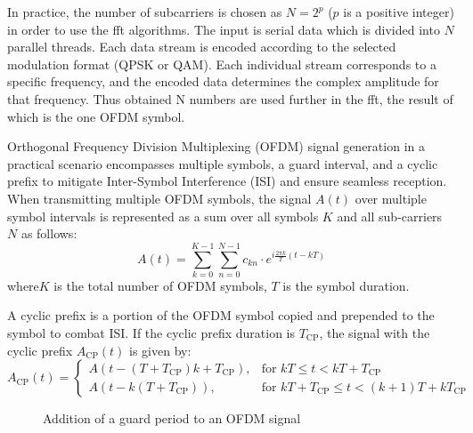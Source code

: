 In practice, the number of subcarriers is chosen as $N = 2^p$ ($p$ is a positive integer) in order to use the \gls{fft} algorithms. 
The input is serial data which is divided into $N$ parallel threads. Each data stream is encoded according to the selected modulation format (QPSK or QAM). Each individual stream corresponds to a specific frequency, and the encoded data determines the complex amplitude for that frequency. Thus obtained N numbers are used further in the \Gls{fft}, the result of which is the one OFDM symbol. 


Orthogonal Frequency Division Multiplexing (OFDM) signal generation in a practical scenario encompasses multiple symbols, a guard interval, and a cyclic prefix to mitigate Inter-Symbol Interference (ISI) and ensure seamless reception. 
When transmitting multiple OFDM symbols, the signal \( A(t) \) over multiple symbol intervals is represented as a sum over all symbols \( K \) and all sub-carriers \( N \) as follows:
\begin{equation}
A(t) = \sum_{k=0}^{K-1} \sum_{n=0}^{N-1} c_{kn} \cdot e^{i \frac{2 \pi k}{T} (t - kT)}
\label{eq:ofdm_signal}
\end{equation}
where\( K \) is the total number of OFDM symbols, \( T \) is the symbol duration.

A cyclic prefix is a portion of the OFDM symbol copied and prepended to the symbol to combat ISI. If the cyclic prefix duration is \( T_{\text{CP}} \), the signal with the cyclic prefix \( A_{\text{CP}}(t) \) is given by:
\begin{equation}
A_{\text{CP}}(t) = 
\begin{cases} 
A(t - (T + T_{\text{CP}})k + T_{\text{CP}}), & \text{for } kT \leq t < kT + T_{\text{CP}} \\
A(t - k(T + T_{\text{CP}})), & \text{for } kT + T_{\text{CP}} \leq t < (k+1)T + kT_{\text{CP}}
\end{cases}
\end{equation}

\begin{figure}[htpb]
    \caption{Addition of a guard period to an OFDM signal}
    \label{fig:ofdm_signal}
\end{figure}

